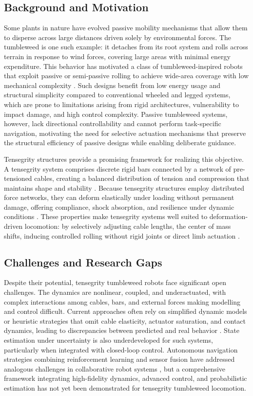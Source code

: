 \documentclass[conference]{IEEEtran}
\begin{document}
\subsection{Background and Motivation}
Some plants in nature have evolved passive mobility mechanisms that allow them to
disperse across large distances driven solely by environmental forces. The
tumbleweed is one such example: it detaches from its root system and rolls
across terrain in response to wind forces, covering large areas with minimal
energy expenditure. This behavior has motivated a class of tumbleweed-inspired
robots that exploit passive or semi-passive rolling to achieve wide-area
coverage with low mechanical complexity \cite{b21,b12}. Such designs benefit
from low energy usage and structural simplicity compared to conventional
wheeled and legged systems, which are prone to limitations arising from rigid
architectures, vulnerability to impact damage, and high control complexity.
Passive tumbleweed systems, however, lack directional controllability and
cannot perform task-specific navigation, motivating the need for selective
actuation mechanisms that preserve the structural efficiency of passive designs
while enabling deliberate guidance.

Tensegrity structures provide a promising framework for realizing this
objective. A tensegrity system comprises discrete rigid bars connected by a
network of pre-tensioned cables, creating a balanced distribution of tension
and compression that maintains shape and stability \cite{b1}. Because
tensegrity structures employ distributed force networks, they can deform
elastically under loading without permanent damage, offering compliance, shock
absorption, and resilience under dynamic conditions \cite{b2}. These properties
make tensegrity systems well suited to deformation-driven locomotion: by
selectively adjusting cable lengths, the center of mass shifts, inducing
controlled rolling without rigid joints or direct limb actuation \cite{b5,b8}.

\subsection{Challenges and Research Gaps}
Despite their potential, tensegrity tumbleweed robots face significant open
challenges. The dynamics are nonlinear, coupled, and underactuated, with
complex interactions among cables, bars, and external forces making modelling
and control difficult. Current approaches often rely on simplified dynamic
models or heuristic strategies that omit cable elasticity, actuator
saturation, and contact dynamics, leading to discrepancies between predicted
and real behavior \cite{b7}. State estimation under uncertainty is also
underdeveloped for such systems, particularly when integrated with closed-loop
control. Autonomous navigation strategies combining reinforcement learning and
sensor fusion have addressed analogous challenges in collaborative robot
systems \cite{b20}, but a comprehensive framework integrating high-fidelity
dynamics, advanced control, and probabilistic estimation has not yet been
demonstrated for tensegrity tumbleweed locomotion.
\end{document}

